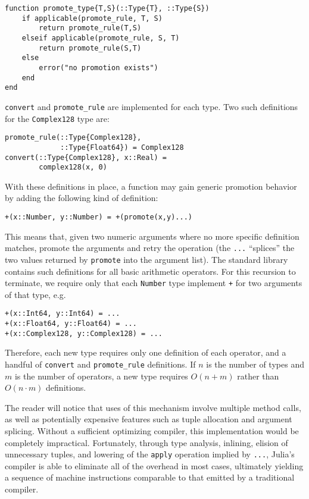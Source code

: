 \documentclass[9pt]{sigplanconf}
\begin{document}
\begin{verbatim}
function promote_type{T,S}(::Type{T}, ::Type{S})
    if applicable(promote_rule, T, S)
        return promote_rule(T,S)
    elseif applicable(promote_rule, S, T)
        return promote_rule(S,T)
    else
        error("no promotion exists")
    end
end
\end{verbatim}

{\tt convert} and {\tt promote\_rule} are implemented for each type. Two
such definitions for the {\tt Complex128} type are:

\begin{verbatim}
promote_rule(::Type{Complex128},
             ::Type{Float64}) = Complex128
convert(::Type{Complex128}, x::Real) =
        complex128(x, 0)
\end{verbatim}

With these definitions in place, a function may gain generic promotion
behavior by adding the following kind of definition:

\begin{verbatim}
+(x::Number, y::Number) = +(promote(x,y)...)
\end{verbatim}

This means that, given two numeric arguments where no more specific
definition matches, promote the arguments and retry the operation
(the {\tt ...} ``splices'' the two values returned by {\tt promote} into
the argument list).
The standard library contains such definitions for all basic arithmetic
operators.
For this recursion to terminate, we require only that each {\tt Number}
type implement {\tt +} for two arguments of that type, e.g.

\begin{verbatim}
+(x::Int64, y::Int64) = ...
+(x::Float64, y::Float64) = ...
+(x::Complex128, y::Complex128) = ...
\end{verbatim}

Therefore, each new type requires only one definition of each operator,
and a handful of {\tt convert} and {\tt promote\_rule} definitions.
If $n$ is the number of types and $m$ is the number of operators, a new
type requires $O(n+m)$ rather than $O(n\cdot m)$ definitions.

The reader will notice that uses of this mechanism involve multiple method
calls, as well as potentially expensive features such as tuple allocation
and argument splicing. Without a sufficient optimizing compiler, this
implementation would be completely impractical. Fortunately, through
type analysis, inlining, elision of unnecessary tuples, and lowering of
the {\tt apply} operation implied by {\tt ...}, Julia's compiler is able
to eliminate all of the overhead in most cases, ultimately yielding a
sequence of machine instructions comparable to that emitted by a
traditional compiler.
\end{document}
